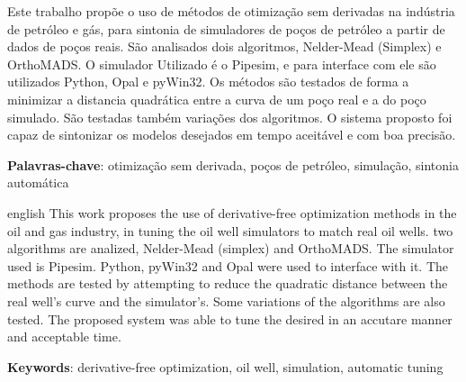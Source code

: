 
\setlength{\absparsep}{18pt} %
\begin{resumo}

Este trabalho propõe o uso de métodos de otimização sem derivadas na indústria de petróleo e gás, para sintonia de simuladores de poços de petróleo a partir de dados de poços reais. São analisados dois algoritmos, Nelder-Mead (Simplex) e OrthoMADS.
O simulador Utilizado é o Pipesim, e para interface com ele são utilizados Python, Opal e pyWin32.
Os métodos são testados de forma a minimizar a distancia quadrática entre a curva de um poço real e a do poço simulado. São testadas também variações dos algoritmos.
O sistema proposto foi capaz de sintonizar os modelos desejados em tempo aceitável e com boa precisão.


 \textbf{Palavras-chave}: otimização sem derivada, poços de petróleo, simulação, sintonia automática 
\end{resumo}

\begin{resumo}[Abstract]
 \begin{otherlanguage*}{english}
This work proposes the use of derivative-free optimization methods in the oil and gas industry, in tuning the oil well simulators to match real oil wells. two algorithms are analized, Nelder-Mead (simplex) and OrthoMADS.
The simulator used is Pipesim. Python, pyWin32 and Opal were used to interface with it.
The methods are tested by attempting to reduce the quadratic distance between the real well's curve and the simulator's.
Some variations of the algorithms are also tested.
The proposed system was able to tune the desired in an accutare manner and acceptable time.


   \vspace{\onelineskip}
 
   \noindent 
   \textbf{Keywords}: derivative-free optimization, oil well, simulation, automatic tuning
 \end{otherlanguage*}
\end{resumo}
